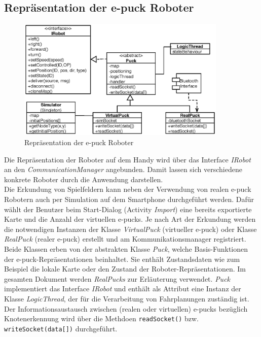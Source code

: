 \documentclass[10pt,a4paper]{article}
\begin{document}
		\subsection{Repräsentation der e-puck Roboter}
			\label{sec:repraesentation}
			\begin{figure}[h]
				\centering
				\includegraphics[width=10cm]{images/android_puck.eps}
  				\caption{Repräsentation der e-puck Roboter}
  				\label{fig:puck}
  			\end{figure}		
      		Die Repräsentation der Roboter auf dem Handy wird über das Interface \textit{IRobot} an den \textit{CommunicationManager} angebunden.
      		Damit lassen sich verschiedene konkrete Roboter durch die Anwendung darstellen.\\
      		Die Erkundung von Spielfeldern kann neben der Verwendung von realen e-puck Robotern auch per Simulation auf dem Smartphone durchgeführt
      		werden. Dafür wählt der Benutzer beim Start-Dialog (Activity \textit{Import}) eine bereits exportierte Karte und die Anzahl der virtuellen
      		e-pucks. Je nach Art der Erkundung werden die notwendigen Instanzen der Klasse \textit{VirtualPuck} (virtueller e-puck) oder Klasse \textit{RealPuck}
      		(realer e-puck)	erstellt und am Kommunikationsmanager registriert. Beide Klassen erben von der abstrakten Klasse \textit{Puck}, welche Basis-Funktionen
      		der e-puck-Repräsentationen beinhaltet.  Sie enthält Zustandsdaten wie zum Beispiel die lokale Karte oder den Zustand der Roboter-Repräsentationen.
      		Im gesamten Dokument werden \textit{RealPucks} zur Erläuterung verwendet.
      		\textit{Puck} implementiert das Interface \textit{IRobot} und enthält als Attribut eine Instanz der Klasse \textit{LogicThread}, der für die Verarbeitung von
      		Fahrplanungen zuständig ist. Der Informationsaustausch zwischen (realen oder virtuellen) e-pucks bezüglich Knotenerkennung wird über die Methdoen
      		\texttt{readSocket()} bzw. \texttt{writeSocket(data[])} durchgeführt.\\
\end{document}
